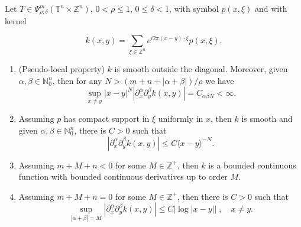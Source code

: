 \documentclass[10pt,a4paper]{amsart}
\begin{document}
\begin{theorem}
    Let $T \in \Psi^m_{\rho, \delta}(\mathbb{T}^n \times \mathbb{Z}^n) $, $0 < \rho \leq 1$, $0 \leq \delta < 1$, with symbol $p(x, \xi)$ and with kernel

    \begin{equation}
        k(x, y) = \sum_{\xi \in \mathbb{Z}^n} e^{i2\pi(x - y) \cdot \xi} p(x, \xi).
    \end{equation}
    \begin{enumerate}
        \item[(a)] (Pseudo-local property) $k$ is smooth outside the diagonal. Moreover, given $\alpha, \beta \in \mathbb{N}^n_0$, then for any $N > (m + n + |\alpha + \beta|)/\rho$ we have
        \begin{equation}
            \sup_{x \neq y} |x - y|^N |\partial^\alpha_x \partial^\beta_y k(x, y)| = C_{\alpha\beta N} < \infty.
            \label{eq:teo3-1a}
        \end{equation}

        \item[(b)] Assuming  $p$ has compact support in $\xi$ uniformly in $x$, then $k$ is smooth and given $\alpha, \beta \in \mathbb{N}^n_0$, there is $C>0$ such that 
        \begin{equation}
            |\partial^\alpha_x \partial^\beta_y k(x, y)| \leq C\langle x - y \rangle^{-N}.
        \end{equation}


        \item[(c)] Assuming $m + M + n < 0$ for some $M \in \mathbb{Z}^+$, then $k$ is a bounded continuous function with bounded continuous derivatives up to order $M$.\\

        \item[(d)] Assuming $m + M + n = 0$ for some $M \in \mathbb{Z}^+$, then there is $ C >0$ such that 
        \begin{equation}
            \sup_{|\alpha + \beta| = M} |\partial^\alpha_x \partial^\beta_y k(x, y)| \leq C | \log |x-y| | \; , \quad x \neq y.
        \end{equation} 
    \end{enumerate}
\end{theorem}
\end{document}
